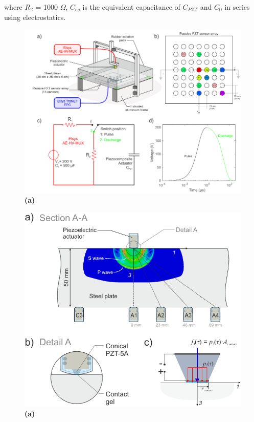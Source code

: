\documentclass[preprint,3p, 11pt,authoryear]{elsarticle}
\begin{document}
\noindent where $R_{2}$ = 1000 $\Omega$, $C_{eq}$ is the equivalent capacitance of $C_{PZT}$ and $C_{0}$ in series using electrostatics.



\begin{figure}[ht]
     	\centering
\includegraphics[scale= 1.0]{FIG1.pdf} 
\caption{\textbf{(a)}  }
	\label{fig1} 
\end{figure}

\begin{figure}[ht]
     	\centering
\includegraphics[scale= 1.0]{FIG2.pdf} 
\caption{\textbf{(a)}  }
	\label{fig2} 
\end{figure}
\end{document}
